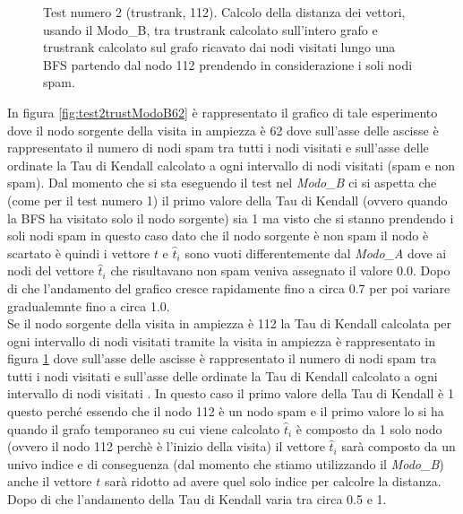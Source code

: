 \begin{figure}
 \caption{Test numero 2 (trustrank, 112). Calcolo della distanza dei vettori, usando il Modo\_B, tra trustrank calcolato sull'intero grafo e trustrank calcolato sul grafo ricavato dai nodi visitati lungo una BFS partendo dal nodo 112 prendendo in considerazione i soli nodi spam.}
 \label{fig:test2trustModoB112}
\end{figure}

In figura \ref{fig:test2trustModoB62} è rappresentato il grafico di tale esperimento dove il nodo sorgente della visita in ampiezza è 62 dove sull'asse delle ascisse è rappresentato il numero di nodi spam tra tutti i nodi visitati e sull'asse delle ordinate la Tau di Kendall calcolato a ogni intervallo di nodi visitati (spam e non spam). Dal momento che si sta eseguendo il test nel \textit{Modo\_B} ci si aspetta che (come per il test numero 1) il primo valore della Tau di Kendall (ovvero quando la BFS ha visitato solo il nodo sorgente) sia 1 ma visto che si stanno prendendo i soli nodi spam in questo caso dato che il nodo sorgente è non spam il nodo è scartato è quindi i vettore \(t\) e \(\hat{t}_i\) sono vuoti differentemente dal \textit{Modo\_A} dove ai nodi del vettore \(\hat{t}_i\) che risultavano non spam veniva assegnato il valore 0.0. Dopo di che l'andamento del grafico cresce rapidamente fino a circa 0.7 per poi variare gradualemnte fino a circa 1.0.\\
Se il nodo sorgente della visita in ampiezza è 112 la Tau di Kendall calcolata  per ogni intervallo di nodi visitati tramite la visita in ampiezza è rappresentato in figura \ref{fig:test2trustModoB112} dove sull'asse delle ascisse è rappresentato il numero di nodi spam tra tutti i nodi visitati e sull'asse delle ordinate la Tau di Kendall calcolato a ogni intervallo di nodi visitati . In questo caso il primo valore della Tau di Kendall è 1 questo perché essendo che il nodo 112 è un nodo spam e il primo valore lo si ha quando il grafo temporaneo su cui viene calcolato \(\hat{t}_i\) è composto da 1 solo nodo (ovvero il nodo 112 perchè è l'inizio della visita) il vettore \(\hat{t}_i\) sarà composto da un univo indice e di conseguenza (dal momento che stiamo utilizzando il \textit{Modo\_B}) anche il vettore \(t\) sarà ridotto ad avere quel solo indice per calcolre la distanza. Dopo di che l'andamento della Tau di Kendall varia tra circa 0.5 e 1.\\
